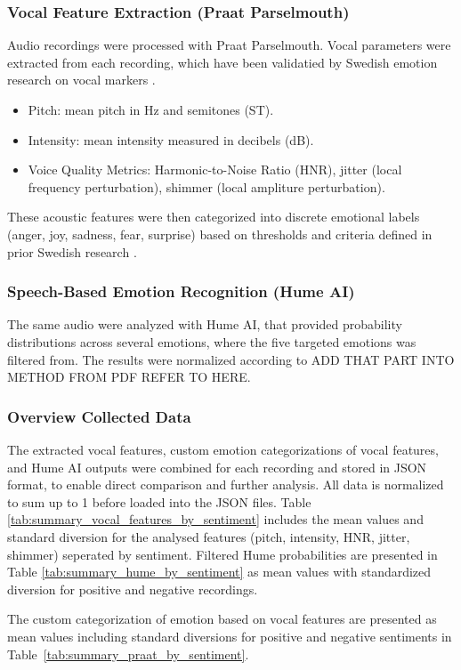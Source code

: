 \subsubsection{Vocal Feature Extraction (Praat Parselmouth)}
Audio recordings were processed with Praat Parselmouth. Vocal parameters were extracted from each recording, which have been validatied by Swedish emotion research on vocal markers \autocite{Ekberg2023}. 
\begin{itemize}
    \item Pitch: mean pitch in Hz and semitones (ST). 
    \item Intensity: mean intensity measured in decibels (dB). 
    \item Voice Quality Metrics: Harmonic-to-Noise Ratio (HNR), jitter (local frequency perturbation), shimmer (local ampliture perturbation). 
\end{itemize}
These acoustic features were then categorized into discrete emotional labels (anger, joy, sadness, fear, surprise) based on thresholds and criteria defined in prior Swedish research \autocite{Ekberg2023}. 

\subsubsection{Speech-Based Emotion Recognition (Hume AI)}
The same audio were analyzed with Hume AI, that provided probability distributions across several emotions, where the five targeted emotions was filtered from. 
The results were normalized according to ADD THAT PART INTO METHOD FROM PDF REFER TO HERE. 

\subsubsection{Overview Collected Data}
The extracted vocal features, custom emotion categorizations of vocal features, and Hume AI outputs were combined for each recording and stored in JSON format, to enable direct comparison and further analysis. All data is normalized to sum up to 1 before loaded into the JSON files. 
Table \ref{tab:summary_vocal_features_by_sentiment} includes the mean values and standard diversion for the analysed features (pitch, intensity, HNR, jitter, shimmer) seperated by sentiment. 
Filtered Hume probabilities are presented in Table \ref{tab:summary_hume_by_sentiment} as mean values with standardized diversion for positive and negative recordings.

The custom categorization of emotion based on vocal features are presented as mean values including standard diversions for positive and negative sentiments in Table~\ref{tab:summary_praat_by_sentiment}. 


